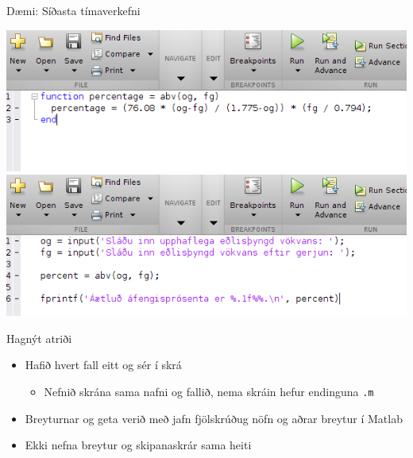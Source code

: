 \documentclass{beamer}
\begin{document}
\begin{frame}{Dæmi: Síðasta tímaverkefni}
\begin{center}
\includegraphics[width=\textwidth]{Pics/abv-function}\\
\vspace{\baselineskip}
\includegraphics[width=\textwidth]{Pics/abv-script}
\end{center}
\end{frame}

\begin{frame}[fragile]{Hagnýt atriði}
\begin{itemize}
 \item Hafið hvert fall eitt og sér í skrá
 \begin{itemize}
  \item Nefnið skrána sama nafni og fallið, nema skráin hefur endinguna \texttt{.m}
 \end{itemize}
 \item Breyturnar og geta verið með jafn fjölskrúðug nöfn og aðrar breytur í Matlab
 \item Ekki nefna breytur og skipanaskrár sama heiti
\end{itemize}
\end{frame}
\end{document}
